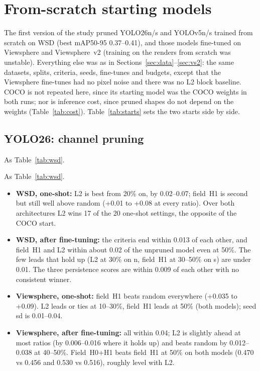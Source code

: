 \documentclass[10pt]{article}
\newcommand{\tnote}[1]{\par\vspace{3pt}\begin{minipage}{\linewidth}\footnotesize #1\end{minipage}}  %
\newcommand{\tbl}[1]{\adjustbox{max width=\linewidth}{}}
\begin{document}
\section{From-scratch starting models}
\label{sec:scratch}

The first version of the study pruned YOLO26n/s and YOLOv5n/s trained from scratch on WSD (best
mAP50-95 0.37--0.41), and those models fine-tuned on Viewsphere and Viewsphere~v2 (training on the
renders from scratch was unstable). Everything else was as in Sections~\ref{sec:data}--\ref{sec:vs2}:
the same datasets, splits, criteria, seeds, fine-tunes and budgets, except that the Viewsphere
fine-tunes had no pixel noise and there was no L2 block baseline. COCO is not repeated here, since its
starting model was the COCO weights in both runs; nor is inference cost, since pruned shapes do not
depend on the weights (Table~\ref{tab:cost}). Table~\ref{tab:starts} sets the two starts side by side.

\subsection{YOLO26: channel pruning}

\begin{table}[H]
\centering\small
\caption{From scratch, WSD: channel pruning by criterion}
\label{tab:wsd-s}
\tbl{wsd_channel_scratch}
\tnote{As Table~\ref{tab:wsd}.}
\end{table}

\begin{table}[H]
\centering\small
\caption{From scratch, Viewsphere: channel pruning by criterion}
\tbl{viewsphere_channel_scratch}
\tnote{As Table~\ref{tab:wsd}.}
\end{table}

\begin{itemize}
\item \textbf{WSD, one-shot:} L2 is best from 20\% on, by 0.02--0.07; field~H1 is second but still well
  above random (+0.01 to +0.08 at every ratio). Over both architectures L2 wins 17 of the 20 one-shot
  settings, the opposite of the COCO start.
\item \textbf{WSD, after fine-tuning:} the criteria end within 0.013 of each other, and field~H1 and L2
  within about 0.02 of the unpruned model even at 50\%. The few leads that hold up (L2 at 30\% on n,
  field~H1 at 30--50\% on s) are under 0.01. The three persistence scores are within 0.009 of each
  other with no consistent winner.
\item \textbf{Viewsphere, one-shot:} field~H1 beats random everywhere (+0.035 to +0.09). L2 leads or
  ties at 10--30\%, field~H1 leads at 50\% (both models); seed sd is 0.01--0.04.
\item \textbf{Viewsphere, after fine-tuning:} all within 0.04; L2 is slightly ahead at most ratios (by
  0.006--0.016 where it holds up) and beats random by 0.012--0.038 at 40--50\%. Field~H0+H1 beats
  field~H1 at 50\% on both models (0.470 vs 0.456 and 0.530 vs 0.516), roughly level with L2.
\end{itemize}
\end{document}
